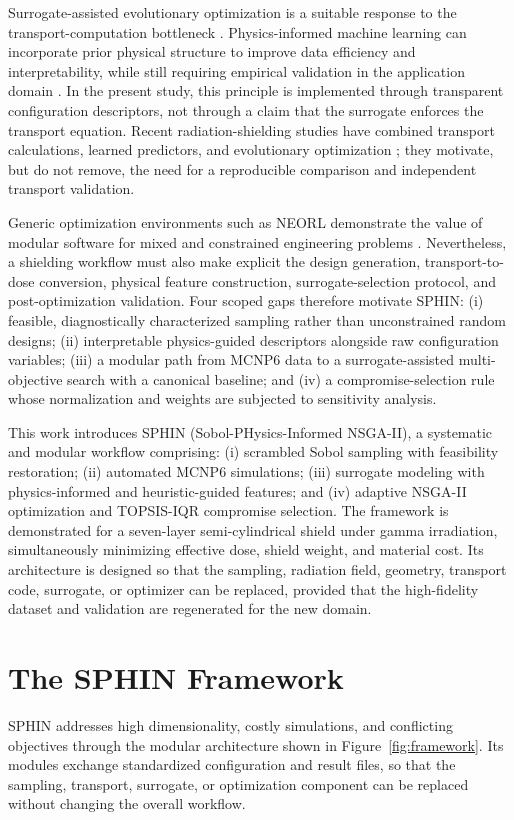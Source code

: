 \documentclass[preprint,12pt]{elsarticle}
\begin{document}
Surrogate-assisted evolutionary optimization is a suitable response to the transport-computation bottleneck \citep{Jin2011,Erdem2025}. Physics-informed machine learning can incorporate prior physical structure to improve data efficiency and interpretability, while still requiring empirical validation in the application domain \citep{Karniadakis2021}. In the present study, this principle is implemented through transparent configuration descriptors, not through a claim that the surrogate enforces the transport equation. Recent radiation-shielding studies have combined transport calculations, learned predictors, and evolutionary optimization \citep{Song2021,Gui2025,He2025,Chowdhury2026}; they motivate, but do not remove, the need for a reproducible comparison and independent transport validation.

Generic optimization environments such as NEORL demonstrate the value of modular software for mixed and constrained engineering problems \citep{Radaideh2023}. Nevertheless, a shielding workflow must also make explicit the design generation, transport-to-dose conversion, physical feature construction, surrogate-selection protocol, and post-optimization validation. Four scoped gaps therefore motivate SPHIN: (i) feasible, diagnostically characterized sampling rather than unconstrained random designs; (ii) interpretable physics-guided descriptors alongside raw configuration variables; (iii) a modular path from MCNP6 data to a surrogate-assisted multi-objective search with a canonical baseline; and (iv) a compromise-selection rule whose normalization and weights are subjected to sensitivity analysis.

This work introduces SPHIN (Sobol-PHysics-Informed NSGA-II), a systematic and modular workflow comprising: (i) scrambled Sobol sampling with feasibility restoration; (ii) automated MCNP6 simulations; (iii) surrogate modeling with physics-informed and heuristic-guided features; and (iv) adaptive NSGA-II optimization and TOPSIS-IQR compromise selection. The framework is demonstrated for a seven-layer semi-cylindrical shield under  gamma irradiation, simultaneously minimizing effective dose, shield weight, and material cost. Its architecture is designed so that the sampling, radiation field, geometry, transport code, surrogate, or optimizer can be replaced, provided that the high-fidelity dataset and validation are regenerated for the new domain.

\section{The SPHIN Framework}
SPHIN addresses high dimensionality, costly simulations, and conflicting objectives through the modular architecture shown in Figure~\ref{fig:framework}. Its modules exchange standardized configuration and result files, so that the sampling, transport, surrogate, or optimization component can be replaced without changing the overall workflow.
\end{document}
